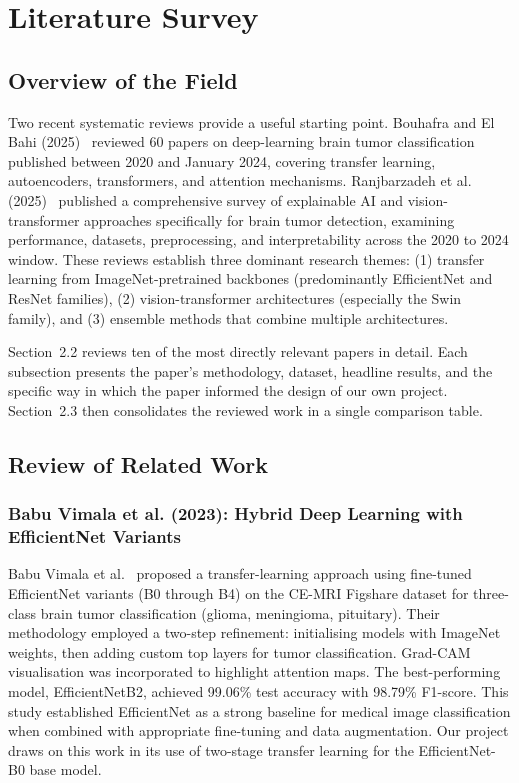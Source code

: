 \documentclass[12pt,a4paper,oneside]{report}
\begin{document}
\chapter{Literature Survey}

\section{Overview of the Field}

Two recent systematic reviews provide a useful starting point. Bouhafra and El Bahi (2025)~\cite{bouhafra2025} reviewed 60 papers on deep-learning brain tumor classification published between 2020 and January 2024, covering transfer learning, autoencoders, transformers, and attention mechanisms. Ranjbarzadeh et al. (2025)~\cite{ranjbarzadeh2025} published a comprehensive survey of explainable AI and vision-transformer approaches specifically for brain tumor detection, examining performance, datasets, preprocessing, and interpretability across the 2020 to 2024 window. These reviews establish three dominant research themes: (1) transfer learning from ImageNet-pretrained backbones (predominantly EfficientNet and ResNet families), (2) vision-transformer architectures (especially the Swin family), and (3) ensemble methods that combine multiple architectures.

Section~2.2 reviews ten of the most directly relevant papers in detail. Each subsection presents the paper's methodology, dataset, headline results, and the specific way in which the paper informed the design of our own project. Section~2.3 then consolidates the reviewed work in a single comparison table.

\section{Review of Related Work}

\subsection{Babu Vimala et al. (2023): Hybrid Deep Learning with EfficientNet Variants}

Babu Vimala et al.~\cite{babuvimala2023} proposed a transfer-learning approach using fine-tuned EfficientNet variants (B0 through B4) on the CE-MRI Figshare dataset for three-class brain tumor classification (glioma, meningioma, pituitary). Their methodology employed a two-step refinement: initialising models with ImageNet weights, then adding custom top layers for tumor classification. Grad-CAM visualisation was incorporated to highlight attention maps. The best-performing model, EfficientNetB2, achieved 99.06\% test accuracy with 98.79\% F1-score. This study established EfficientNet as a strong baseline for medical image classification when combined with appropriate fine-tuning and data augmentation. Our project draws on this work in its use of two-stage transfer learning for the EfficientNet-B0 base model.
\end{document}
